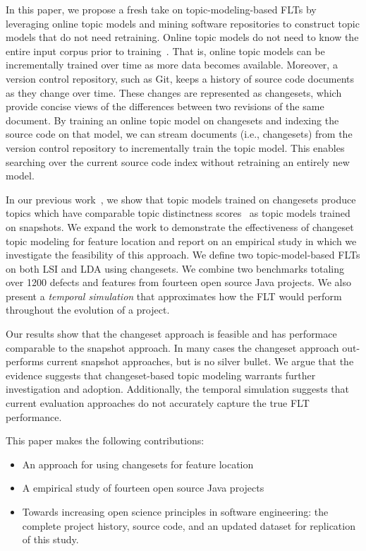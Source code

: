 In this paper, we propose a fresh take on topic-modeling-based FLTs by leveraging online topic models and mining software repositories to construct topic models that do not need retraining.
Online topic models do not need to know the entire input corpus prior to training~\cite{Hoffman-etal:2010,Radim:2011}.
That is, online topic models can be incrementally trained over time as more data becomes available.
Moreover, a version control repository, such as Git, keeps a history of source code documents as they change over time.
These changes are represented as changesets, which provide concise views of the differences between two revisions of the same document.
By training an online topic model on changesets and indexing the source code on that model, we can stream documents (i.e., changesets) from the version control repository to incrementally train the topic model.
This enables searching over the current source code index without retraining an entirely new model.

In our previous work~\cite{Corley-etal:2014}, we show that topic models trained on changesets produce topics which have comparable
topic distinctness scores~\cite{Thomas-etal:2011} as topic models trained on snapshots.
We expand the work to demonstrate the effectiveness of changeset topic modeling for feature location and report on an empirical study in which we investigate the feasibility of this approach.
We define two topic-model-based FLTs on both LSI and LDA using changesets.
We combine two benchmarks totaling over 1200 defects and features from fourteen open source Java projects.
We also present a \emph{temporal simulation} that approximates how the FLT would perform throughout the evolution of a project.

Our results show that the changeset approach is feasible and has performace comparable to the snapshot approach.
In many cases the changeset approach out-performs current snapshot approaches, but is no silver bullet.
We argue that the evidence suggests that changeset-based topic modeling warrants further investigation and adoption.
Additionally, the temporal simulation suggests that current evaluation approaches do not accurately capture the true FLT performance.

This paper makes the following contributions:

\begin{itemize}
    \item An approach for using changesets for feature location
    \item A empirical study of fourteen open source Java projects
    \item Towards increasing open science principles in software engineering:
        the complete project history, source code, and an updated dataset for
        replication of this study.
\end{itemize}


